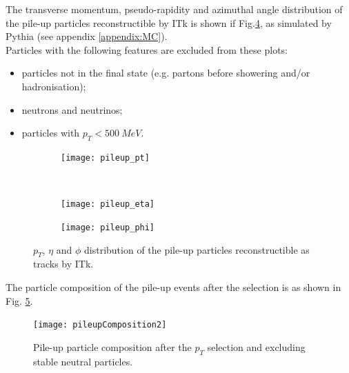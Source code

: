\documentclass[a4paper,twoside,12pt]{article}
\begin{document}
The transverse momentum, pseudo-rapidity and azimuthal angle distribution of the pile-up particles reconstructible by ITk is shown if Fig.\ref{fig:pileupDists}, as simulated by 
Pythia (see appendix \ref{appendix:MC}).\\

Particles with the following
features are excluded from these plots:

\begin{itemize}
\item particles not in the final state (e.g. partons before showering and/or hadronisation);
\item neutrons and neutrinos;
\item particles with $p_{T} < 500\ MeV$.
\end{itemize}

\begin{figure}
\begin{subfigure}{\linewidth}
\texttt{[image: pileup\_pt]}
\caption{}
\label{fig:pileup_pt}
\end{subfigure}\\[1ex]
\begin{subfigure}{.5\linewidth}
\centering
\texttt{[image: pileup\_eta]}
\caption{}
\label{fig:pileup_eta}
\end{subfigure}
\begin{subfigure}{.5\linewidth}
\centering
\texttt{[image: pileup\_phi]}
\caption{}
\label{fig:pileup_phi}
\end{subfigure}
\caption{$p_{T}$, $\eta$ and $\phi$ distribution of the pile-up particles reconstructible as tracks by ITk.}
\label{fig:pileupDists}
\end{figure}

The particle composition of the pile-up events after the selection is as shown in Fig.
\ref{fig:pileupComposition}. 

\begin{figure} [h]
	\texttt{[image: pileupComposition2]}
	\caption{Pile-up particle composition after the $p_{T}$ selection and excluding stable neutral particles.}
	\label{fig:pileupComposition}
\end{figure}

\end{document}
